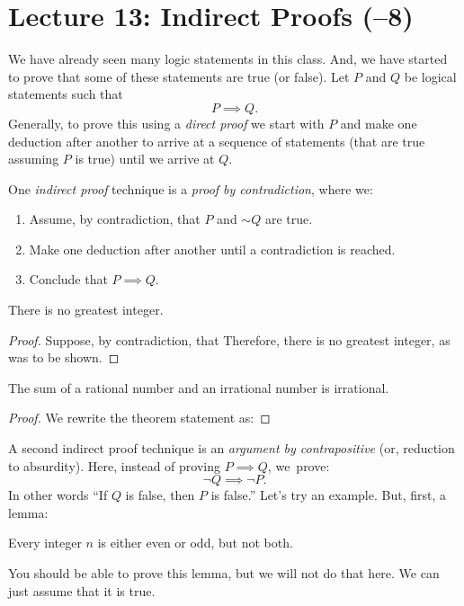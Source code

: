 \section*{Lecture 13: Indirect Proofs (--8)}

We have already seen many logic statements in this class.  And, we have started
to prove that some of these statements are true (or false).  Let $P$ and $Q$ be
logical statements such that
$$ P \implies Q.$$
Generally, to prove this using a \emph{direct proof} we start with $P$ and make
one deduction after another to arrive at a sequence of statements (that are true
assuming $P$ is true) until we arrive at $Q$.

One \emph{indirect proof} technique is a \emph{proof by contradiction}, where
we:
\begin{enumerate}
    \item Assume, by contradiction, that $P$ and $\sim Q$ are true.
    \item Make one deduction after another until a contradiction is reached.
    \item Conclude that $P \implies Q$.
\end{enumerate}

\begin{theorem}
    There is no greatest integer.
\end{theorem}
\begin{proof}
    Suppose, by contradiction, that
    \proofspace
    Therefore, there is no greatest integer, as was to be shown.
\end{proof}

\begin{theorem}
    The sum of a rational number and an irrational number is irrational.
\end{theorem}
\begin{proof}
    We rewrite the theorem statement as:

    \proofspace
\end{proof}

\pagebreak
A second indirect proof technique is an \emph{argument by contrapositive} (or,
reduction to absurdity).
Here, instead of proving $P \implies Q$, we~prove:
$$ \neg Q \implies \neg P. $$
In other words ``If $Q$ is false, then $P$ is false.''
Let's try an example.  But, first, a lemma:

\begin{lemma}
    Every integer $n$ is either even or odd, but not both.
\end{lemma}
You should be able to prove this lemma, but we will not do that here.  We can
just assume that it is true.

